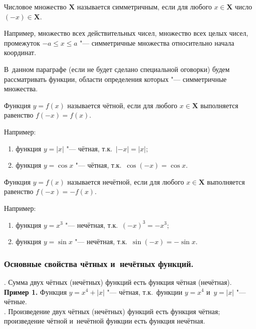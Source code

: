 \begin{Def}
Числовое множество $\mathbf{X}$ называется симметричным, если для любого
$x \in \mathbf{X}$ число $(-x) \in \mathbf{X}$.
\end{Def}

Например, множество всех действительных чисел, множество всех целых чисел,
промежуток $-a \leqslant x \leqslant a$ "--- симметричные множества
относительно начала координат.

В~данном параграфе (если не будет сделано специальной оговорки) будем
рассматривать функции, области определения которых "---
симметричные множества.

\begin{Def}
Функция $y = f(x)$ называется чётной, если для любого $x \in \mathbf{X}$
выполняется равенство $f(-x) = f(x)$.
\end{Def}
Например:
\begin{enumerate}
\item функция $y = |x|$ "--- чётная, т.к.\ $|-x| = |x|$;
\item функция $y = \cos x$ "--- чётная, т.к.\ $\cos (-x) = \cos x$.
\end{enumerate}

\begin{Def}
Функция $y = f(x)$ называется нечётной, если для любого $x \in \mathbf{X}$
выполняется равенство $f(-x) = -f(x)$.
\end{Def}
Например:
\begin{enumerate}
\item функция $y = x^{3}$ "--- нечётная, т.к.\ $(-x)^{3} = -x^{3}$;
\item функция $y = \sin x$ "--- нечётная, т.к.\ $\sin (-x) = -\sin x$.
\end{enumerate}


\subsubsection{Основные свойства чётных и~нечётных функций.}

. Сумма двух чётных (нечётных) функций есть функция чётная (нечётная). \\

\indent \textbf{Пример 1.} Функция $y = x^{4} + |x|$ "--- чётная, т.к.\ функции
$y = x^{4}$ и~$y = |x|$ "--- чётные. \\

. Произведение двух чётных (нечётных) функций есть функция чётная;
произведение чётной и~нечётной функции есть функция нечётная. \\

